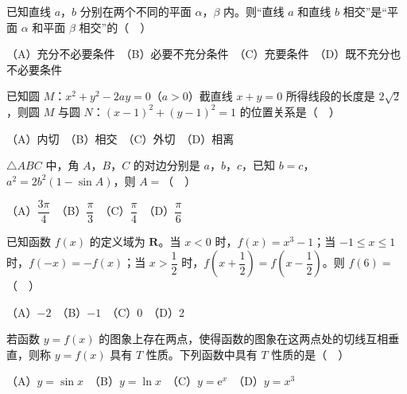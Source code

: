 \begin{question}
已知直线 \(a\)，\(b\) 分别在两个不同的平面 \(\alpha\)，\(\beta\) 内。则“直线 \(a\) 和直线 \(b\) 相交”是“平面 \(\alpha\) 和平面 \(\beta\) 相交”的（　）

（A）充分不必要条件　（B）必要不充分条件　（C）充要条件　（D）既不充分也不必要条件

\end{question}
\begin{question}
已知圆 \(M\)：\(x^2+y^2-2ay=0\)（\(a>0\)）截直线 \(x+y=0\) 所得线段的长度是 \(2\sqrt{2}\)，则圆 \(M\) 与圆 \(N\)：\((x-1)^2+(y-1)^2=1\) 的位置关系是（　）

（A）内切　（B）相交　（C）外切　（D）相离

\end{question}
\begin{question}
\(\triangle ABC\) 中，角 \(A\)，\(B\)，\(C\) 的对边分别是 \(a\)，\(b\)，\(c\)，已知 \(b=c\)，\(a^2=2b^2(1-\sin A)\)，则 \(A=\)（　）

（A）\(\dfrac{3\pi}{4}\)　（B）\(\dfrac{\pi}{3}\)　（C）\(\dfrac{\pi}{4}\)　（D）\(\dfrac{\pi}{6}\)

\end{question}
\begin{question}
已知函数 \(f(x)\) 的定义域为 \(\mathbf{R}\)。当 \(x<0\) 时，\(f(x)=x^3-1\)；当 \(-1\leqslant x\leqslant 1\) 时，\(f(-x)=-f(x)\)；当 \(x>\dfrac{1}{2}\) 时，\(f\left(x+\dfrac{1}{2}\right)=f\left(x-\dfrac{1}{2}\right)\)。则 \(f(6)=\)（　）

（A）\(-2\)　（B）\(-1\)　（C）0　（D）2

\end{question}
\begin{question}
若函数 \(y=f(x)\) 的图象上存在两点，使得函数的图象在这两点处的切线互相垂直，则称 \(y=f(x)\) 具有 \(T\) 性质。下列函数中具有 \(T\) 性质的是（　）

（A）\(y=\sin x\)　（B）\(y=\ln x\)　（C）\(y=\mathrm{e}^x\)　（D）\(y=x^3\)

\end{question}


